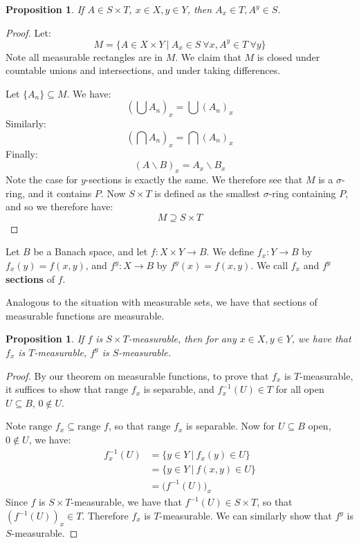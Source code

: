 \documentclass[a4paper,12pt]{report}
\newcommand{\range}{ \text{range } }
\newcommand{\sse} {\subseteq}
\newcommand{\bs} {\backslash}
\newtheorem{prop}[theorem]{Proposition}
\newenvironment{definition}[1][Definition.]{\begin{trivlist}
\item[\hskip \labelsep {\bfseries #1}]}{\end{trivlist}}
\begin{document}
	\begin{prop}
	If $A \in S \times T$, $x \in X, y \in Y$, then $A_x \in T, A^y \in S$. 
	\end{prop}
	\begin{proof}
	Let:
	\[ M = \bigg\{ A \in X \times Y ~\big|~ A_x \in S ~ \forall x, A^y \in T ~ \forall y \bigg\} \]
	Note all measurable rectangles are in $M$. We claim that $M$ is closed under countable unions and intersections, and under taking differences. 
	
	Let $\{A_n\} \sse M$. We have:
	\[ \left( \bigcup A_n \right)_x = \bigcup (A_n)_x \]
	Similarly:
	\[ \left( \bigcap A_n \right)_x = \bigcap (A_n)_x \]
	Finally:
	\[ (A \bs B)_x = A_x \bs B_x \]
	Note the case for $y$-sections is exactly the same. We therefore see that $M$ is a $\sigma$-ring, and it contains $P$. Now $S \times T$ is defined as the smallest $\sigma$-ring containing $P$, and so we therefore have:
	\[ M \supseteq S \times T \]
	\end{proof}
	
	\begin{definition}
	Let $B$ be a Banach space, and let $f : X \times Y \rightarrow B$. We define $f_x : Y \rightarrow B$ by $f_x(y) = f(x, y)$, and $f^y : X \rightarrow B$ by $f^y(x) = f(x, y)$.  We call $f_x$ and $f^y$ \textbf{sections} of $f$.
	\end{definition}

	\noindent Analogous to the situation with measurable sets, we have that sections of measurable functions are measurable. 	
	
	\begin{prop}
	If $f$ is $S \times T$-measurable, then for any $x \in X, y \in Y$, we have that $f_x$ is $T$-measurable, $f^y$ is $S$-measurable.
	\end{prop}
	\begin{proof}
	By our theorem on measurable functions, to prove that $f_x$ is $T$-measurable, it suffices to show that $\range f_x$ is separable, and $f_x^{-1}(U) \in T$ for all open $U \sse B$, $0 \notin U$. 
	
	Note $\range f_x \sse \range f$, so that $\range f_x$ is separable. Now for $U \sse B$ open, $0 \notin U$, we have:
	\begin{align*} 
	f_x^{-1}(U) &= \{ y \in Y ~|~ f_x(y) \in U \} \\
	&= \{ y \in Y ~|~ f(x, y) \in U \} \\
	&= \big(f^{-1}(U) \big)_x
	\end{align*}
	Since $f$ is $S \times T$-measurable, we have that $f^{-1}(U) \in S \times T$, so that $(f^{-1}(U))_x \in T$. Therefore $f_x$ is $T$-measurable. We can similarly show that $f^y$ is $S$-measurable.
	\end{proof}
	
\end{document}
